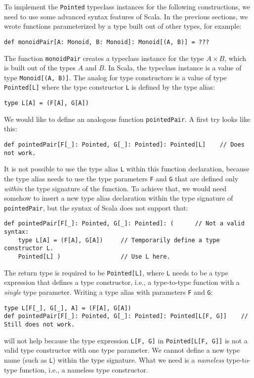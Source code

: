 To implement the \lstinline!Pointed! typeclass instances for the
following constructions, we need to use some advanced syntax features
of Scala. In the previous sections, we wrote functions parameterized
by a type built out of other types, for example:
\begin{lstlisting}
def monoidPair[A: Monoid, B: Monoid]: Monoid[(A, B)] = ???
\end{lstlisting}
The function \lstinline!monoidPair! creates a typeclass instance
for the type $A\times B$, which is built out of the types $A$ and
$B$. In Scala, the typeclass instance is a value of type \lstinline!Monoid[(A, B)]!.
The analog for type constructors is a value of type \lstinline!Pointed[L]!
where the type constructor \lstinline!L! is defined by the type alias:
\begin{lstlisting}
type L[A] = (F[A], G[A])
\end{lstlisting}
We would like to define an analogous function \lstinline!pointedPair!.
A first try looks like this:
\begin{lstlisting}
def pointedPair[F[_]: Pointed, G[_]: Pointed]: Pointed[L]    // Does not work.
\end{lstlisting}
It is not possible to use the type alias \lstinline!L! within this
function declaration, because the type alias needs to use the type
parameters \lstinline!F! and \lstinline!G! that are defined only
\emph{within} the type signature of the function. To achieve that,
we would need somehow to insert a new type alias declaration within
the type signature of \lstinline!pointedPair!, but the syntax of
Scala does not support that:
\begin{lstlisting}
def pointedPair[F[_]: Pointed, G[_]: Pointed]: (      // Not a valid syntax:
    type L[A] = (F[A], G[A])     // Temporarily define a type constructor L.
    Pointed[L] )                 // Use L here.
\end{lstlisting}
The return type is required to be \lstinline!Pointed[L]!, where \lstinline!L!
needs to be a type expression that defines a type constructor, i.e.,
a type-to-type function with a \emph{single} type parameter. Writing
a type alias with parameters \lstinline!F! and \lstinline!G!:
\begin{lstlisting}
type L[F[_], G[_], A] = (F[A], G[A])
def pointedPair[F[_]: Pointed, G[_]: Pointed]: Pointed[L[F, G]]    // Still does not work.
\end{lstlisting}
will not help because the type expression \lstinline!L[F, G]! in
\lstinline!Pointed[L[F, G]]! is not a valid type constructor with
one type parameter. We cannot define a new type name (such as \lstinline!L!)
within the type signature. What we need is a \emph{nameless} type-to-type
function, i.e., a nameless type constructor.

